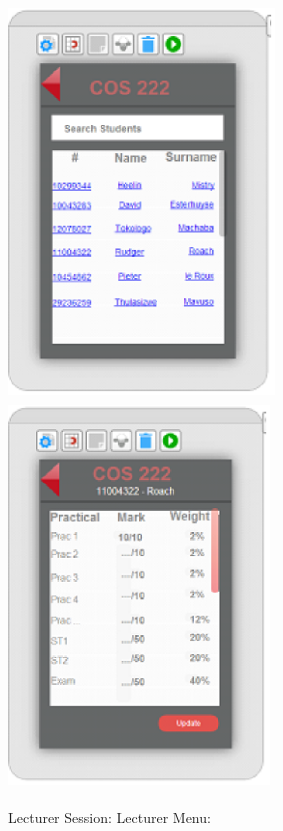 \documentclass{article}
\begin{document}
\noindent \includegraphics*[width=2.78in, height=4.06in, keepaspectratio=false]{image17}     \includegraphics*[width=2.73in, height=4.04in, keepaspectratio=false]{image18}

\noindent 

\noindent 

\noindent            Lecturer Session:       Lecturer Menu:
\end{document}
